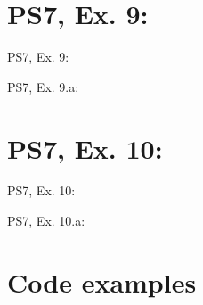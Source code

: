 \section{PS7, Ex. 9: }

\begin{frame}{PS7, Ex. 9: }
  \begin{multicols}{2}
    \vfill\null\columnbreak
    \vfill
  \end{multicols}
\end{frame}

\begin{frame}{PS7, Ex. 9.a: }
  \begin{multicols}{2}
    \vfill\null\columnbreak
    \vfill
  \end{multicols}
\end{frame}



\section{PS7, Ex. 10: }

\begin{frame}{PS7, Ex. 10: }
  \begin{multicols}{2}
    \vfill\null\columnbreak
    \vfill
  \end{multicols}
\end{frame}

\begin{frame}{PS7, Ex. 10.a: }
  \begin{multicols}{2}
    \vfill\null\columnbreak
    \vfill
  \end{multicols}
\end{frame}



\section{Code examples} %

